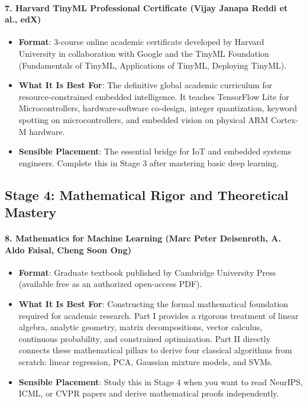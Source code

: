 \paragraph{7. Harvard TinyML Professional Certificate (Vijay Janapa Reddi et al., edX)}
\begin{itemize}
    \item \textbf{Format}: 3-course online academic certificate developed by Harvard University in collaboration with Google and the TinyML Foundation (Fundamentals of TinyML, Applications of TinyML, Deploying TinyML).
    \item \textbf{What It Is Best For}: The definitive global academic curriculum for resource-constrained embedded intelligence. It teaches TensorFlow Lite for Microcontrollers, hardware-software co-design, integer quantization, keyword spotting on microcontrollers, and embedded vision on physical ARM Cortex-M hardware.
    \item \textbf{Sensible Placement}: The essential bridge for IoT and embedded systems engineers. Complete this in Stage 3 after mastering basic deep learning.
\end{itemize}

\subsection{Stage 4: Mathematical Rigor and Theoretical Mastery}

\paragraph{8. Mathematics for Machine Learning (Marc Peter Deisenroth, A. Aldo Faisal, Cheng Soon Ong)}
\begin{itemize}
    \item \textbf{Format}: Graduate textbook published by Cambridge University Press (available free as an authorized open-access PDF).
    \item \textbf{What It Is Best For}: Constructing the formal mathematical foundation required for academic research. Part I provides a rigorous treatment of linear algebra, analytic geometry, matrix decompositions, vector calculus, continuous probability, and constrained optimization. Part II directly connects these mathematical pillars to derive four classical algorithms from scratch: linear regression, PCA, Gaussian mixture models, and SVMs.
    \item \textbf{Sensible Placement}: Study this in Stage 4 when you want to read NeurIPS, ICML, or CVPR papers and derive mathematical proofs independently.
\end{itemize}

